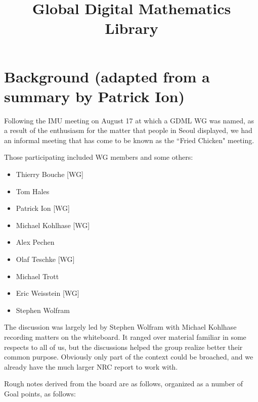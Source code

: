 \documentclass{article}
\begin{document}
\title{Global Digital Mathematics Library}

\maketitle

\section{Background (adapted from a summary by Patrick Ion)}

Following the IMU meeting on August 17 at which a GDML WG was named,
as a result of the enthusiasm for the matter that people in Seoul
displayed, we had an informal meeting that has come to be known as the
``Fried Chicken" meeting. 

Those participating included WG members and some others:
\begin{itemize}
\item Thierry Bouche [WG]
\item Tom Hales
\item Patrick Ion [WG]
\item Michael Kohlhase [WG]
\item Alex Pechen
\item Olaf Teschke [WG]
\item Michael Trott
\item Eric Weisstein [WG]
\item Stephen Wolfram
\end{itemize}

The discussion was largely led by Stephen Wolfram with Michael
Kohlhase recording matters on the whiteboard.  It ranged over material
familiar in some respects to all of us, but the discussions helped the
group realize better their common purpose.  Obviously only part of the
context could be broached, and we already have the much larger NRC
report to work with.

Rough notes derived from the board are as follows, organized as a
number of Goal points, as follows:
\end{document}
